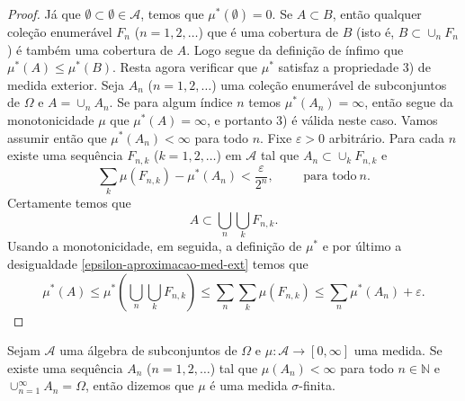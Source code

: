 \begin{proof}
Já que $\emptyset\subset \emptyset \in \mathcal{A}$, temos que $\mu^{*}(\emptyset)=0$.
Se $A\subset B$, então qualquer coleção enumerável $F_n$ ($n=1,2,\ldots$) que é uma 
cobertura de $B$ (isto é, $B\subset \cup_n F_n$) é também uma cobertura de $A$.
Logo segue da definição de ínfimo que $\mu^{*}(A)\leq \mu^{*}(B)$.
Resta agora verificar que $\mu^{*}$ satisfaz a propriedade 3) de medida exterior.
Seja $A_n$ ($n=1,2,\ldots$) uma coleção enumerável de subconjuntos de $\Omega$
e $A=\cup_n A_n$. Se para algum índice $n$ temos $\mu^{*}(A_n)=\infty$,
então segue da monotonicidade $\mu$ que $\mu^{*}(A)=\infty$, e portanto 
3) é válida neste caso. Vamos assumir então que $\mu^{*}(A_n)<\infty$ 
para todo $n$. Fixe $\varepsilon>0$ arbitrário. Para cada $n$ existe
uma sequência $F_{n,k}$ ($k=1,2,\ldots$) em $\mathcal{A}$ tal que 
$A_n\subset \cup _k F_{n,k}$ e 
\begin{equation}\label{epsilon-aproximacao-med-ext}
\sum_k \mu(F_{n,k}) -\mu^{*}(A_n) < \frac{\varepsilon}{2^n},
\qquad
\text{ para todo}\ n.
\end{equation}
Certamente temos que 
$$
A\subset \bigcup_{n}\bigcup_{k} F_{n,k}.
$$
Usando a monotonicidade, em seguida, a definição de $\mu^{*}$ e por 
último a desigualdade \eqref{epsilon-aproximacao-med-ext} temos que
$$
\mu^{*}(A)
\leq 
\mu^{*}\left( \bigcup_{n}\bigcup_{k} F_{n,k} \right)
\leq
\sum_{n}\sum_{k} \mu(F_{n,k})
\leq \sum_{n}\mu^{*}(A_n) +\varepsilon.
$$
\end{proof}
 
 

\begin{definicao}
	Sejam $\mathcal{A}$ uma álgebra de subconjuntos de $\Omega$ e 
	$\mu:\mathcal{A}\to [0,\infty]$ uma medida.
	Se existe uma sequência $A_n$ ($n=1,2,\ldots$) tal que $\mu(A_n)<\infty$ 
	para todo $n\in\mathbb{N}$ e $\cup_{n=1}^{\infty}A_n =\Omega$, então 
	dizemos que $\mu$ é uma medida $\sigma$-finita.
\end{definicao} 
 
